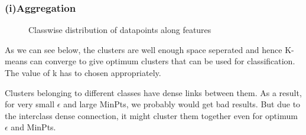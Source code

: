 \documentclass[paper=a4, fontsize=11pt]{scrartcl}
\numberwithin{equation}{section}		%
\numberwithin{figure}{section}			%
\numberwithin{table}{section}				%
\begin{document}
\subsubsection*{(i)Aggregation}
\begin{figure}[H]
  \centering
  \hfill
  \caption*{Classwise distribution of datapoints along features}
\end{figure}

As we can see below, the clusters are well enough space seperated  and hence K-means can converge to give optimum clusters that can be used for classification. The value of k has to chosen appropriately.

Clusters belonging to different classes have dense links between them. As a result, for very small $\epsilon$ and large MinPts, we probably would get bad results. But due to the interclass dense connection, it might cluster them together even for optimum $\epsilon$ and MinPts.
\end{document}
